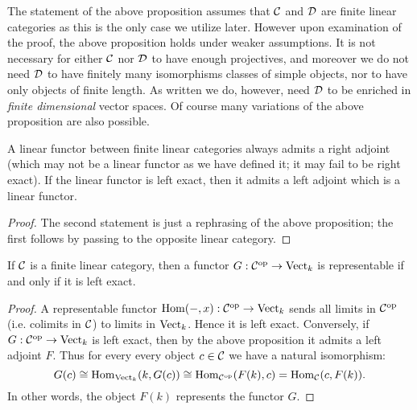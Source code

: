 \documentclass[a4paper]{amsart}
\begin{document}
\begin{remark}
	The statement of the above proposition assumes that $\mathcal C$ and $\mathcal D$ are finite linear categories as this is the only case we utilize later. However upon examination of the proof, the above proposition holds under weaker assumptions. It is not necessary for either $\mathcal C$ nor $\mathcal D$ to have enough projectives, and moreover we do not need $\mathcal D$ to have finitely many isomorphisms classes of simple objects, nor to have only objects of finite length. As written we do, however, need $\mathcal D$ to be enriched in {\em finite dimensional} vector spaces. Of course many variations of the above proposition are also possible. 
\end{remark}

\begin{corollary}
	A linear functor between finite linear categories always admits a right adjoint (which may not be a linear functor as we have defined it; it may fail to be right exact). If the linear functor is left exact, then it admits a left adjoint which is a linear functor. 
\end{corollary}

\begin{proof}
	The second statement is just a rephrasing of the above proposition; the first follows by passing to the opposite linear category.  
\end{proof}


\begin{corollary}
If $\mathcal C$ is a finite linear category, then a functor $G: \mathcal C^\textrm{op} \to \mathrm{Vect}_k$ is representable if and only if it is left exact. 
\end{corollary}

\begin{proof}
	A representable functor $\operatorname{Hom}(-, x):\mathcal C^\text{op} \to \mathrm{Vect}_k$ sends all limits in $\mathcal C^\text{op}$ (i.e. colimits in $\mathcal C$) to limits in $\mathrm{Vect}_k$. Hence it is left exact. 
%
%		
Conversely, if $G: \mathcal C^\text{op} \to \mathrm{Vect}_k$ is left exact, then by the above proposition it admits a left adjoint $F$. Thus for every every object $c \in \mathcal C$ we have a natural isomorphism:
	\begin{equation*}
		G(c) \cong \operatorname{Hom}_{\mathrm{Vect}_k}( k, G(c)) \cong \operatorname{Hom}_{\mathcal C^{\mathrm{op}}}( F(k), c) = \operatorname{Hom}_{\mathcal C}(c, F(k) ).
	\end{equation*}
	In other words,  the object $F(k)$ represents the functor $G$. 
\end{proof}
\end{document}
